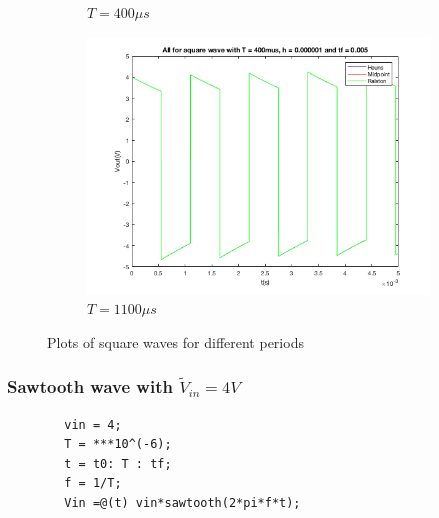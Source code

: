 \documentclass[11pt,a4paper]{article}
\begin{document}
\begin{figure}[h]
\begin{subfigure}{.5\textwidth}
          \caption{$T = 400\mu s$}
          \label{fig:sfig7}
        \end{subfigure}
        \begin{subfigure}{.5\textwidth}
          \centering
          \includegraphics[width=.8\linewidth]{Ex1_Figs/square1100.png}
          \caption{$T = 1100\mu s$}
          \label{fig:sfig8}
        \end{subfigure}
        \caption{Plots of square waves for different periods}
        \label{fig:test5}
    \end{figure}


\newpage

\subsubsection{Sawtooth wave with $\tilde{V}_{in} = 4V$}

    \begin{verbatim}
        vin = 4;
        T = ***10^(-6);
        t = t0: T : tf;
        f = 1/T;
        Vin =@(t) vin*sawtooth(2*pi*f*t);
    \end{verbatim}
\end{document}
